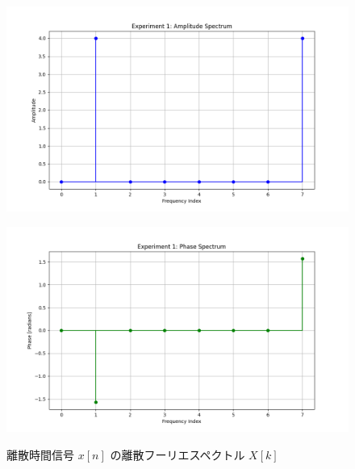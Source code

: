 \documentclass[fleqn, a4paper. 12pt]{jsarticle}
\begin{document}
    \begin{figure}[h]
      \begin{center}
      \begin{minipage}[t]{0.48\columnwidth}
          \includegraphics[width=\columnwidth]{amplitude_spectrum_experiment_1.png}
          \label{fign:a1}
      \end{minipage}
      \begin{minipage}[t]{0.48\columnwidth}
          \includegraphics[width=\columnwidth]{phase_spectrum_experiment_1.png}
          \label{fign:p1}
      \end{minipage}
      \end{center}
      \caption{離散時間信号 $x[n]$ の離散フーリエスペクトル $X[k]$}
    \end{figure}
\end{document}
